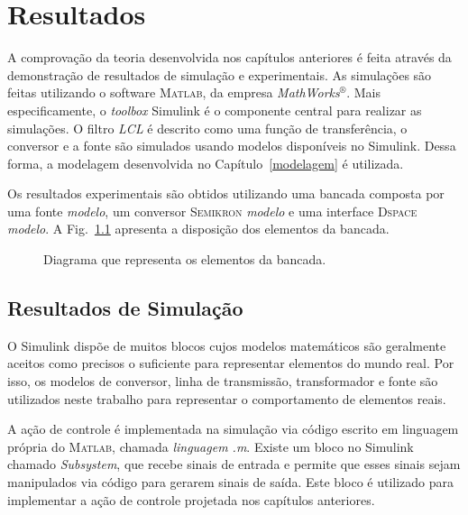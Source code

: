 
\chapter{Resultados}\label{resultados}

    A comprovação da teoria desenvolvida nos capítulos anteriores é feita através da demonstração de resultados de simulação e experimentais. As simulações são feitas utilizando o software \textsc{Matlab}, da empresa \textit{MathWorks}$^\circledR$. Mais especificamente, o \textit{toolbox} Simulink é o componente central para realizar as simulações. O filtro \textit{LCL} é descrito como uma função de transferência, o conversor e a fonte são simulados usando modelos disponíveis no Simulink. Dessa forma, a modelagem desenvolvida no Capítulo~\ref{modelagem} é utilizada.

    Os resultados experimentais são obtidos utilizando uma bancada composta por uma fonte \textit{modelo}, um conversor \textsc{Semikron} \textit{modelo} e uma interface \textsc{Dspace} \textit{modelo}. A Fig.~\ref{fig:topologia_bancada} apresenta a disposição dos elementos da bancada.

    \begin{figure}[htb]
        \centering{
            \def\svgwidth{\textwidth}
            }
        \renewcommand\figurename{Fig.}
        \caption{Diagrama que representa os elementos da bancada.}
        \label{fig:topologia_bancada}
    \end{figure}


\section{Resultados de Simulação}

	O Simulink dispõe de muitos blocos cujos modelos matemáticos são geralmente aceitos como precisos o suficiente para representar elementos do mundo real. Por isso, os modelos de conversor, linha de transmissão, transformador e fonte são utilizados neste trabalho para representar o comportamento de elementos reais.

	A ação de controle é implementada na simulação via código escrito em linguagem própria do \textsc{Matlab}, chamada \textit{linguagem .m}. Existe um bloco no Simulink chamado \textit{Subsystem}, que recebe sinais de entrada e permite que esses sinais sejam manipulados via código para gerarem sinais de saída. Este bloco é utilizado para implementar a ação de controle projetada nos capítulos anteriores.

